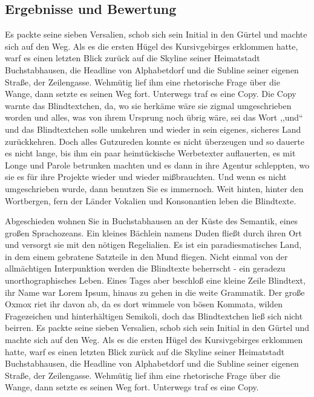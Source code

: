\documentclass[12pt,a4paper,twoside]{scrartcl}
\numberwithin{equation}{section}
\begin{document}
\subsection{Ergebnisse und Bewertung}

Es packte seine sieben Versalien, schob sich sein Initial in den Gürtel und machte sich auf den Weg. Als es die ersten Hügel des Kursivgebirges erklommen hatte, warf es einen letzten Blick zurück auf die Skyline seiner Heimatstadt Buchstabhausen, die Headline von Alphabetdorf und die Subline seiner eigenen Straße, der Zeilengasse. Wehmütig lief ihm eine rhetorische Frage über die Wange, dann setzte es seinen Weg fort. Unterwegs traf es eine Copy. Die Copy warnte das Blindtextchen, da, wo sie herkäme wäre sie zigmal umgeschrieben worden und alles, was von ihrem Ursprung noch übrig wäre, sei das Wort ,,und`` und das Blindtextchen solle umkehren und wieder in sein eigenes, sicheres Land zurückkehren. Doch alles Gutzureden konnte es nicht überzeugen und so dauerte es nicht lange, bis ihm ein paar heimtückische Werbetexter auflauerten, es mit Longe und Parole betrunken machten und es dann in ihre Agentur schleppten, wo sie es für ihre Projekte wieder und wieder mißbrauchten. Und wenn es nicht umgeschrieben wurde, dann benutzen Sie es immernoch. Weit hinten, hinter den Wortbergen, fern der Länder Vokalien und Konsonantien leben die Blindtexte.

Abgeschieden wohnen Sie in Buchstabhausen an der Küste des Semantik, eines großen Sprachozeans. Ein kleines Bächlein namens Duden fließt durch ihren Ort und versorgt sie mit den nötigen Regelialien. Es ist ein paradiesmatisches Land, in dem einem gebratene Satzteile in den Mund fliegen. Nicht einmal von der allmächtigen Interpunktion werden die Blindtexte beherrscht - ein geradezu unorthographisches Leben. Eines Tages aber beschloß eine kleine Zeile Blindtext, ihr Name war Lorem Ipsum, hinaus zu gehen in die weite Grammatik. Der große Oxmox riet ihr davon ab, da es dort wimmele von bösen Kommata, wilden Fragezeichen und hinterhältigen Semikoli, doch das Blindtextchen ließ sich nicht beirren. Es packte seine sieben Versalien, schob sich sein Initial in den Gürtel und machte sich auf den Weg. Als es die ersten Hügel des Kursivgebirges erklommen hatte, warf es einen letzten Blick zurück auf die Skyline seiner Heimatstadt Buchstabhausen, die Headline von Alphabetdorf und die Subline seiner eigenen Straße, der Zeilengasse. Wehmütig lief ihm eine rhetorische Frage über die Wange, dann setzte es seinen Weg fort. Unterwegs traf es eine Copy.
\end{document}
